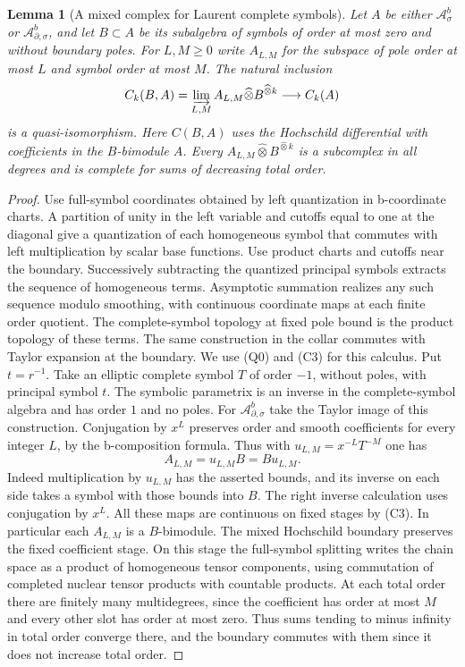 \documentclass[11pt,oneside,reqno]{article}
\newcommand{\Asb}{\mathcal A^b_\sigma}
\newcommand{\Adsb}{\mathcal A^b_{\partial,\sigma}}
\theoremstyle{plain}
\newtheorem{lemma}[theorem]{Lemma}
\theoremstyle{definition}
\theoremstyle{remark}
\begin{document}
\begin{lemma}[A mixed complex for Laurent complete symbols]
\label{lem:mixed-symbols}
Let \(A\) be either \(\Asb\) or \(\Adsb\), and let \(B\subset A\)
be its subalgebra of symbols of order at most zero and without
boundary poles. For \(L,M\geq0\) write \(A_{L,M}\) for the subspace
of pole order at most \(L\) and symbol order at most \(M\). The
natural inclusion
\[
 C_k(B,A)=\varinjlim_{L,M} A_{L,M}\widehat\otimes B^{\widehat\otimes k}
 \longrightarrow C_k(A)
\]
is a quasi-isomorphism. Here \(C(B,A)\) uses the Hochschild differential
with coefficients in the \(B\)-bimodule \(A\). Every
\(A_{L,M}\widehat\otimes B^{\widehat\otimes k}\) is a subcomplex in all
degrees and is complete for sums of decreasing total order.
\end{lemma}

\begin{proof}
Use full-symbol coordinates obtained by left quantization in
b-coordinate charts. A partition of unity in the left variable
and cutoffs equal to one at the diagonal give a quantization of
each homogeneous symbol that commutes with left multiplication
by scalar base functions. Use product charts and cutoffs near the
boundary. Successively subtracting the quantized principal symbols
extracts the sequence of homogeneous terms. Asymptotic summation
realizes any such sequence modulo smoothing, with continuous
coordinate maps at each finite order quotient. The complete-symbol
topology at fixed pole bound is the product topology of these
terms. The same construction in the collar commutes with Taylor
expansion at the boundary. We use (Q0) and (C3) for this calculus.
Put \(t=r^{-1}\). Take an elliptic complete symbol
\(T\) of order \(-1\), without poles, with principal symbol \(t\).
The symbolic parametrix is an inverse in the complete-symbol algebra
and has order \(1\) and no poles. For \(\Adsb\) take the Taylor
image of this construction. Conjugation by \(x^L\) preserves order and
smooth coefficients for every integer \(L\), by the b-composition
formula. Thus with \(u_{L,M}=x^{-L}T^{-M}\) one has
\[
 A_{L,M}=u_{L,M}B=B u_{L,M}.
\]
Indeed multiplication by \(u_{L,M}\) has the asserted bounds, and its
inverse on each side takes a symbol with those bounds into \(B\).
The right inverse calculation uses conjugation by \(x^L\). All these
maps are continuous on fixed stages by (C3). In particular each
\(A_{L,M}\) is a \(B\)-bimodule. The mixed Hochschild boundary preserves
the fixed coefficient stage. On this stage the full-symbol splitting
writes the chain space as a product of homogeneous tensor components,
using commutation of completed nuclear tensor products with countable
products. At each total order there are finitely many multidegrees,
since the coefficient has order at most \(M\) and every other slot
has order at most zero. Thus sums tending to minus infinity in total
order converge there, and the boundary commutes with them since it
does not increase total order.


\end{proof}
\end{document}
